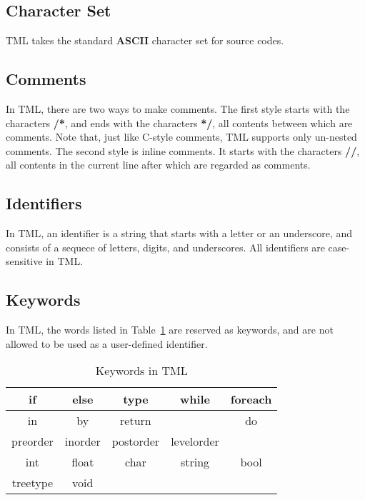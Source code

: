 \documentclass[12pt,psfig,a4]{article}
\begin{document}

\subsection{Character Set}
TML takes the standard \textbf{ASCII} character set for source codes.

\subsection{Comments}
In TML, there are two ways to make comments. The first style starts with the characters \textbf{/*}, and ends with the characters \textbf{*/}, all contents between which are comments. Note that, just like C-style comments, TML supports only un-nested comments. The second style is inline comments. It starts with the characters \textbf{//}, all contents in the current line after which are regarded as comments.

\subsection{Identifiers} \label{lexConId}
In TML, an identifier is a string that starts with a letter or an underscore, and consists of a sequece of letters, digits, and underscores. %
All identifiers are case-sensitive in TML.

\subsection{Keywords}
In TML, the words listed in Table~\ref{keywords} are reserved as keywords, and are not allowed to be used as a user-defined identifier.

\begin{table}[!ht]
\begin{center}
\begin{tabular}{| c | c | c | c | c |}
\hline
if & else & type & while & foreach \\
\hline
in & by & return & & do\\  %
\hline
preorder & inorder & postorder & levelorder &\\
\hline
int & float & char & string & bool  \\
\hline
treetype & void & & & \\
\hline
\end{tabular}
\caption{Keywords in TML}
\label{keywords}
\end {center}
\end{table}
\end{document}
